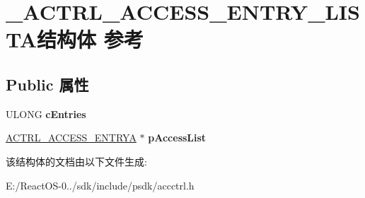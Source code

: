 \hypertarget{struct___a_c_t_r_l___a_c_c_e_s_s___e_n_t_r_y___l_i_s_t_a}{}\section{\+\_\+\+A\+C\+T\+R\+L\+\_\+\+A\+C\+C\+E\+S\+S\+\_\+\+E\+N\+T\+R\+Y\+\_\+\+L\+I\+S\+T\+A结构体 参考}
\label{struct___a_c_t_r_l___a_c_c_e_s_s___e_n_t_r_y___l_i_s_t_a}
\subsection*{Public 属性}
\begin{DoxyCompactItemize}
\item 
\mbox{\label{struct___a_c_t_r_l___a_c_c_e_s_s___e_n_t_r_y___l_i_s_t_a_a5ffb4b651e31a5477b4d623078075022}} 
U\+L\+O\+NG {\bfseries c\+Entries}
\item 
\mbox{\label{struct___a_c_t_r_l___a_c_c_e_s_s___e_n_t_r_y___l_i_s_t_a_a7da50b02d8c144ca6fc1d8bcdaeb83b4}} 
\hyperlink{struct___a_c_t_r_l___a_c_c_e_s_s___e_n_t_r_y_a}{A\+C\+T\+R\+L\+\_\+\+A\+C\+C\+E\+S\+S\+\_\+\+E\+N\+T\+R\+YA} $\ast$ {\bfseries p\+Access\+List}
\end{DoxyCompactItemize}


该结构体的文档由以下文件生成\+:\begin{DoxyCompactItemize}
\item 
E\+:/\+React\+O\+S-\/0../sdk/include/psdk/accctrl.\+h\end{DoxyCompactItemize}
